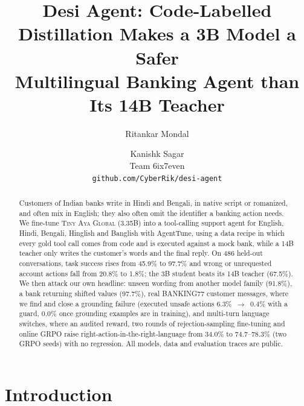 \documentclass[11pt]{article}
\title{Desi Agent: Code-Labelled Distillation Makes a 3B Model a Safer\\Multilingual Banking Agent than Its 14B Teacher}
\author{Ritankar Mondal \and Kanishk Sagar \\
  Team 6ix7even \\
  \texttt{github.com/CyberRik/desi-agent}}
\begin{document}
\maketitle

\begin{abstract}
Customers of Indian banks write in Hindi and Bengali, in native script or romanized, and often mix in English; they
also often omit the identifier a banking action needs. We fine-tune \textsc{Tiny Aya Global} (3.35B) into a
tool-calling support agent for English, Hindi, Bengali, Hinglish and Banglish with AgentTune, using a data recipe in
which every gold tool call comes from code and is executed against a mock bank, while a 14B teacher only writes the
customer's words and the final reply. On 486 held-out conversations, task success rises from 45.9\% to 97.7\% and
wrong or unrequested account actions fall from 20.8\% to 1.8\%; the 3B student beats its 14B teacher (67.5\%). We
then attack our own headline: unseen wording from another model family (91.8\%), a bank returning shifted values
(97.7\%), real BANKING77 customer messages, where we find and close a grounding failure (executed unsafe actions
6.3\%~$\rightarrow$~0.4\% with a guard, 0.0\% once grounding examples are in training), and multi-turn language
switches, where an audited reward, two rounds of rejection-sampling fine-tuning and online GRPO raise
right-action-in-the-right-language from 34.0\% to 74.7--78.3\% (two GRPO seeds) with no regression. All models, data and
evaluation traces are public.
\end{abstract}

\noindent{}

\section{Introduction}
\end{document}
